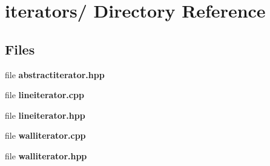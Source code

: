 \section{iterators/ Directory Reference}
\label{dir_000001}
\subsection*{Files}
\begin{CompactItemize}
\item 
file {\bf abstractiterator.hpp}
\item 
file {\bf lineiterator.cpp}
\item 
file {\bf lineiterator.hpp}
\item 
file {\bf walliterator.cpp}
\item 
file {\bf walliterator.hpp}
\end{CompactItemize}
